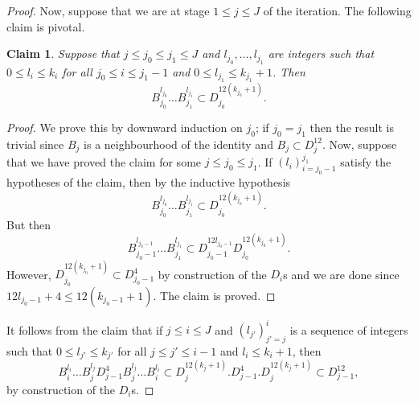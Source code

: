 \documentclass[12pt]{amsart}
\numberwithin{equation}{section}
\theoremstyle{plain}
\newtheorem*{claim}{Claim}
\theoremstyle{definition}
\renewcommand{\leq}{\leqslant}
\begin{document}
\begin{proof}
Now, suppose that we are at stage $1 \leq j \leq J$ of the iteration. The following claim is pivotal.
\begin{claim}
Suppose that $j \leq j_0\leq j_1 \leq J$ and $l_{j_0},\dots,l_{j_1}$ are integers such that $0 \leq l_i \leq k_i$ for all $j_0 \leq i \leq j_1 -1$ and $0 \leq l_{j_1} \leq k_{j_1}+1$. Then
\begin{equation*}
B_{j_0}^{l_{j_0}} \dots B_{j_1}^{l_{j_1}} \subset D_{j_0}^{12(k_{j_0}+1)}.
\end{equation*}
\end{claim}
\begin{proof} 
We prove this by downward induction on $j_0$; if $j_0=j_1$ then the result is trivial since $B_j$ is a neighbourhood of the identity and $B_j \subset D_j^{12}$.  Now, suppose that we have proved the claim for some $j \leq j_0 \leq j_1$.  If $(l_i)_{i=j_0-1}^{j_1}$ satisfy the hypotheses of the claim, then by the inductive hypothesis
\begin{equation*}
B_{j_0}^{l_{j_0}} \dots B_{j_1}^{l_{j_1}} \subset D_{j_0}^{12(k_{j_0}+1)}.
\end{equation*}
But then
\begin{equation*}
B_{j_0-1}^{l_{j_0-1}} \dots B_{j_1}^{l_{j_1}} \subset D_{j_0-1}^{12l_{j_0-1}}D_{j_0}^{12(k_{j_0}+1)}.
\end{equation*}
However, $D_{j_0}^{12(k_{j_0}+1)} \subset D_{j_0-1}^4$ by construction of the $D_i$s and we are done since $12l_{j_0-1} + 4 \leq 12(k_{j_0-1}+1)$.  The claim is proved.
\end{proof}
It follows from the claim that if $j \leq i \leq J$ and $(l_{j'})_{j'=j}^i$ is a sequence of integers such that $0 \leq l_{j'} \leq k_{j'}$ for all $j \leq j' \leq i-1$ and $l_{i} \leq k_{i}+1$, then
\begin{equation}\label{eqn.ort}
B_{i}^{l_{i}}\dots B_{j}^{l_{j}} D_{j-1}^4B_{j}^{l_{j}} \dots B_{i}^{l_{i}}  \subset D_{j}^{12(k_{j}+1)}.D_{j-1}^4. D_{j}^{12(k_{j}+1)} \subset D_{j-1}^{12},
\end{equation}
by construction of the $D_i$s. 


\end{proof}
\end{document}
